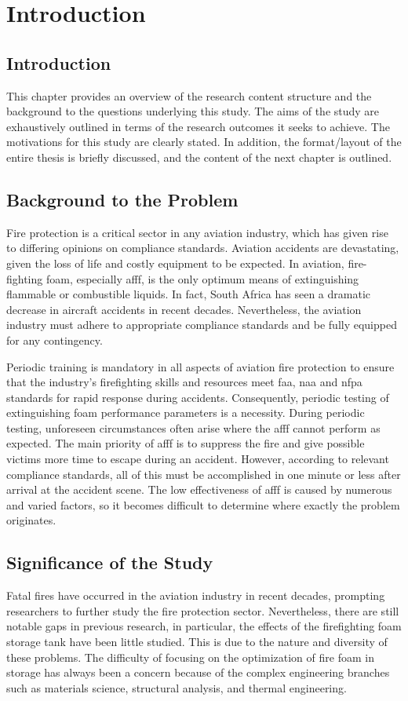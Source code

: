 \chapter{Introduction}
\section{Introduction}
This chapter provides an overview of the research content structure and the background to the questions underlying this study. The aims of the study are exhaustively outlined in terms of the research outcomes it seeks to achieve. The motivations for this study are clearly stated. In addition, the format/layout of the entire thesis is briefly discussed, and the content of the next chapter is outlined.

\section{Background to the Problem}
Fire protection is a critical sector in any aviation industry, which has given rise to differing opinions on compliance standards. Aviation accidents are devastating, given the loss of life and costly equipment to be expected. In aviation, fire-fighting foam, especially \Acrfull{afff}, is the only optimum means of extinguishing flammable or combustible liquids. In fact, South Africa has seen a dramatic decrease in aircraft accidents in recent decades. Nevertheless, the aviation industry must adhere to appropriate compliance standards and be fully equipped for any contingency. 

Periodic training is mandatory in all aspects of aviation fire protection to ensure that the industry's firefighting skills and resources meet \Acrfull{faa}, \Acrfull{naa} and \Acrfull{nfpa} standards for rapid response during accidents. Consequently, periodic testing of extinguishing foam performance parameters is a necessity. During periodic testing, unforeseen circumstances often arise where the \acrshort{afff} cannot perform as expected. The main priority of \acrshort{afff} is to suppress the fire and give possible victims more time to escape during an accident. However, according to relevant compliance standards, all of this must be accomplished in one minute or less after arrival at the accident scene. The low effectiveness of \acrshort{afff} is caused by numerous and varied factors, so it becomes difficult to determine where exactly the problem originates.

\section{Significance of the Study}
Fatal fires have occurred in the aviation industry in recent decades, prompting researchers to further study the fire protection sector. Nevertheless, there are still notable gaps in previous research, in particular, the effects of the firefighting foam storage tank have been little studied. This is due to the nature and diversity of these problems. The difficulty of focusing on the optimization of fire foam in storage has always been a concern because of the complex engineering branches such as materials science, structural analysis, and thermal engineering.  

